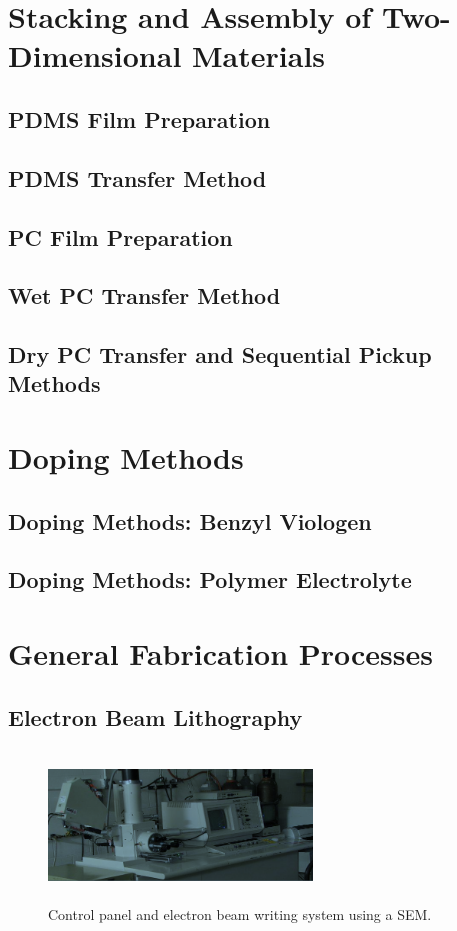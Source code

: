 \section{Stacking and Assembly of Two-Dimensional Materials}\label{sec:transfer}
\subsection{PDMS Film Preparation}\label{subsec:pdms_prep}
\subsection{PDMS Transfer Method}\label{subsec:pdms_transfer}
\subsection{PC Film Preparation}\label{subsec:pc_prep}
\subsection{Wet PC Transfer Method}\label{subsec:_wet_pc_transfer}
\subsection{Dry PC Transfer and Sequential Pickup Methods}\label{subsec:dry_pc_transfer}

\section{Doping Methods}\label{sec:chemical_doping}
\subsection{Doping Methods: Benzyl Viologen}\label{subsec:doping_bv}
\subsection{Doping Methods: Polymer Electrolyte}\label{subsec:doping_pe}

\section{General Fabrication Processes}\label{sec:fab_processes}
\subsection{Electron Beam Lithography}\label{subsec:ebl}
\begin{figure}[ht]
    \centering
    \includegraphics[height=4cm,width=7cm]{SEM}
    \caption[Scanning electron microscope]{Control panel and electron beam writing system using a \acs{SEM}.}
\end{figure} 
